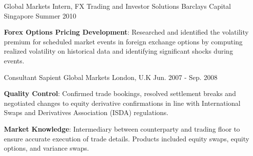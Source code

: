 \begin{cventries}
{\begin{cvitems}
      \end{cvitems}
    }
  \cventry
    {Global Markets Intern, FX Trading and Investor Solutions}
    {Barclays Capital}
    {Singapore}
    {Summer 2010}
    {
      \begin{cvitems}
        \item {\textbf{Forex Options Pricing Development}: Researched and identified the volatility premium for scheduled  
        market events in foreign exchange options by computing realized volatility on historical data and   
        identifying significant shocks during events}.
      \end{cvitems} 
    }
  \cventry
    {Consultant}
    {Sapient Global Markets}
    {London, U.K}
    {Jun. 2007 - Sep. 2008}
    {
      \begin{cvitems}
        \item {\textbf{Quality Control}: Confirmed trade bookings, resolved settlement breaks and negotiated 
        changes to equity derivative confirmations in line with International Swaps and Derivatives Association 
        (ISDA) regulations}.
        \item {\textbf{Market Knowledge}: Intermediary between counterparty and trading floor to ensure accurate execution of trade details. Products included equity swaps, equity options, and variance swaps}.
      \end{cvitems}
    }
\end{cventries}
